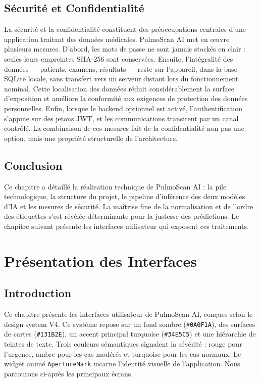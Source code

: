\documentclass[12pt,a4paper]{report}
\begin{document}
\section{Sécurité et Confidentialité}
La sécurité et la confidentialité constituent des préoccupations centrales d'une application traitant des données médicales. PulmoScan AI met en œuvre plusieurs mesures. D'abord, les mots de passe ne sont jamais stockés en clair : seules leurs empreintes SHA-256 sont conservées. Ensuite, l'intégralité des données --- patients, examens, résultats --- reste sur l'appareil, dans la base SQLite locale, sans transfert vers un serveur distant lors du fonctionnement nominal. Cette localisation des données réduit considérablement la surface d'exposition et améliore la conformité aux exigences de protection des données personnelles. Enfin, lorsque le backend optionnel est activé, l'authentification s'appuie sur des jetons JWT, et les communications transitent par un canal contrôlé. La combinaison de ces mesures fait de la confidentialité non pas une option, mais une propriété structurelle de l'architecture.

\section*{Conclusion}
Ce chapitre a détaillé la réalisation technique de PulmoScan AI : la pile technologique, la structure du projet, le pipeline d'inférence des deux modèles d'IA et les mesures de sécurité. La maîtrise fine de la normalisation et de l'ordre des étiquettes s'est révélée déterminante pour la justesse des prédictions. Le chapitre suivant présente les interfaces utilisateur qui exposent ces traitements.

\chapter{Présentation des Interfaces}

\section*{Introduction}
Ce chapitre présente les interfaces utilisateur de PulmoScan AI, conçues selon le design system V4. Ce système repose sur un fond sombre (\texttt{\#0A0F1A}), des surfaces de cartes (\texttt{\#131B2E}), un accent principal turquoise (\texttt{\#34E5C5}) et une hiérarchie de teintes de texte. Trois couleurs sémantiques signalent la sévérité : rouge pour l'urgence, ambre pour les cas modérés et turquoise pour les cas normaux. Le widget animé \texttt{ApertureMark} incarne l'identité visuelle de l'application. Nous parcourons ci-après les principaux écrans.
\end{document}
